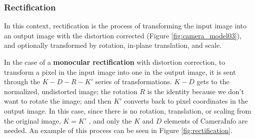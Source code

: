 \subsubsection{Rectification}
\label{sec:rectification}
In this context, rectification is the process of transforming the input image into an output image with the distortion corrected (Figure \ref{fig:camera_model03}), and optionally transformed by rotation, in-plane translation, and scale.

In the case of a \textbf{monocular rectification} with distortion correction, to transform a pixel in the input image into one in the output image, it is sent through the $K - D - R - K'$ series of transformations. $K - D$ gets to the normalized, undistorted image; the rotation $R$ is the identity because we don't want to rotate the image; and then $K'$ converts back to pixel coordinates in the output image. In this case, since there is no rotation, translation, or scaling from the original image, $K = K'$ , and only the $K$ and $D$ elements of CameraInfo are needed.
An example of this process can be seen in Figure \ref{fig:rectification}.

